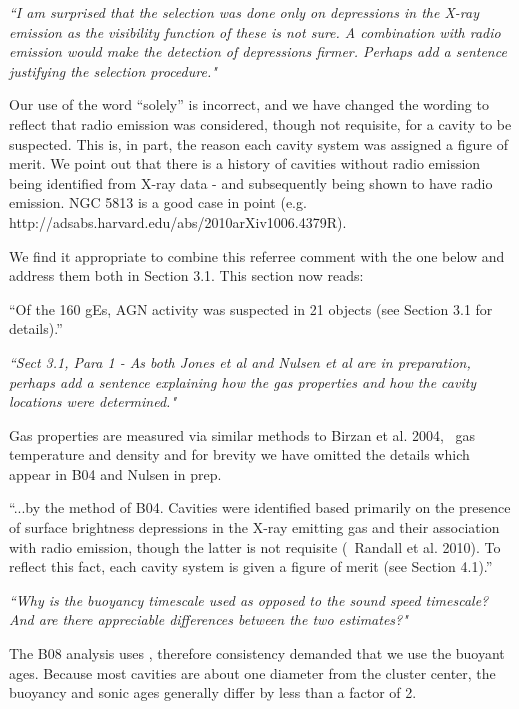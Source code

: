 \documentclass[11pt]{article}
\begin{document}
{\it{``I am surprised that the selection was done only on depressions
    in the X-ray emission as the visibility function of these is not
    sure. A combination with radio emission would make the detection
    of depressions firmer. Perhaps add a sentence justifying the
    selection procedure."}}

Our use of the word ``solely'' is incorrect, and we have changed the
wording to reflect that radio emission was considered, though not
requisite, for a cavity to be suspected. This is, in part, the reason
each cavity system was assigned a figure of merit. We point out that
there is a history of cavities without radio emission being identified
from X-ray data - and subsequently being shown to have radio emission.
NGC 5813 is a good case in point
(e.g. http://adsabs.harvard.edu/abs/2010arXiv1006.4379R).

We find it appropriate to combine this referree comment with the one
below and address them both in Section 3.1. This section now reads:

``Of the 160 gEs, AGN activity was suspected in 21 objects (see
Section 3.1 for details).''

\hrulefill

{\it{``Sect 3.1, Para 1 - As both Jones et al and Nulsen et al are in
    preparation, perhaps add a sentence explaining how the gas
    properties and how the cavity locations were determined."}}

Gas properties are measured via similar methods to Birzan et al. 2004,
\ie\ gas temperature and density and for brevity we have omitted the
details which appear in B04 and Nulsen in prep.

``...by the method of B04. Cavities were identified based primarily on
the presence of surface brightness depressions in the X-ray emitting
gas and their association with radio emission, though the latter is
not requisite (\eg\ Randall et al. 2010). To reflect this fact, each
cavity system is given a figure of merit (see Section 4.1).''

\hrulefill

{\it{``Why is the buoyancy timescale used as opposed to the sound speed
    timescale? And are there appreciable differences between the two
    estimates?"}}

The B08 analysis uses \tbuoy, therefore consistency demanded that we
use the buoyant ages. Because most cavities are about one diameter
from the cluster center, the buoyancy and sonic ages generally differ
by less than a factor of 2.
\end{document}
